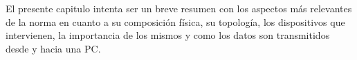 El presente capitulo intenta ser un breve resumen con los aspectos más relevantes de la norma en cuanto a su composición física, su topología, los dispositivos que intervienen, la importancia de los mismos y como los datos son transmitidos desde y hacia una PC.\\

%	
%	
%		
